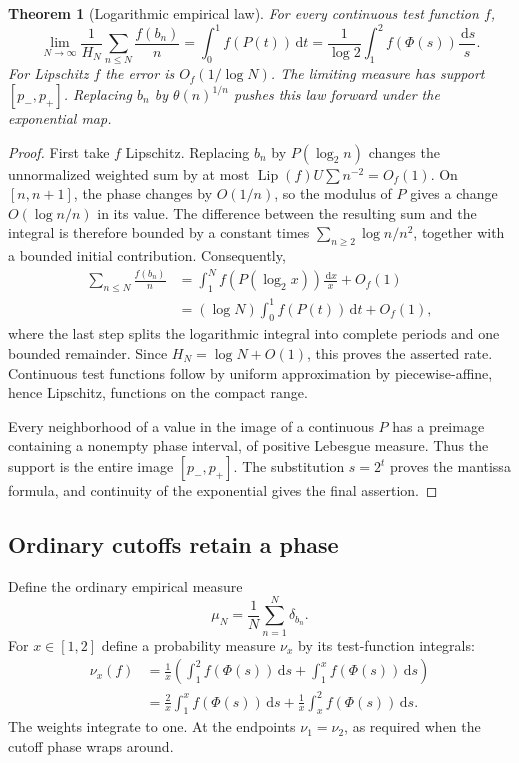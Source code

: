 \documentclass[11pt,a4paper]{article}
\numberwithin{equation}{section}
\newtheorem{theorem}{Theorem}[section]
\theoremstyle{definition}
\theoremstyle{remark}
\newcommand{\dd}{\,\mathrm d}
\theoremstyle{definition}
\theoremstyle{plain}
\begin{document}
\begin{theorem}[Logarithmic empirical law]
\label{dsr:thm:log-law}
For every continuous test function $f$,
\begin{equation}
 \lim_{N\to\infty}\frac1{H_N}\sum_{n\le N}\frac{f(b_n)}n
   =\int_0^1f(P(t))\dd t
   =\frac1{\log2}\int_1^2 f(\Phi(s))\frac{\dd s}{s}.
\label{dsr:eq:log-law}
\end{equation}
For Lipschitz $f$ the error is $O_f(1/\log N)$. The limiting measure has
support $[p_-,p_+]$. Replacing $b_n$ by $\theta(n)^{1/n}$ pushes this law
forward under the exponential map.
\end{theorem}
\begin{proof}
First take $f$ Lipschitz. Replacing $b_n$ by $P(\log_2n)$ changes the
unnormalized weighted sum by at most
$\operatorname{Lip}(f)U\sum n^{-2}=O_f(1)$.
On $[n,n+1]$, the phase changes by $O(1/n)$, so the modulus of $P$ gives a
change $O(\log n/n)$ in its value. The difference between the resulting sum
and the integral is therefore bounded by a constant times
$\sum_{n\ge2}\log n/n^2$, together with a bounded initial contribution.
Consequently,
\begin{align}
 \sum_{n\le N}\frac{f(b_n)}n
 &=\int_1^N f(P(\log_2x))\frac{\dd x}{x}+O_f(1)\\
 &=(\log N)\int_0^1f(P(t))\dd t+O_f(1),
\end{align}
where the last step splits the logarithmic integral into complete periods
and one bounded remainder. Since $H_N=\log N+O(1)$, this proves the asserted
rate. Continuous test functions follow by uniform approximation by
piecewise-affine, hence Lipschitz, functions on the compact range.

Every neighborhood of a value in the image of a continuous $P$ has a
preimage containing a nonempty phase interval, of positive Lebesgue measure.
Thus the support is the entire image $[p_-,p_+]$. The substitution
$s=2^t$ proves the mantissa formula, and continuity of the exponential gives
the final assertion.
\end{proof}

\subsection{Ordinary cutoffs retain a phase}
Define the ordinary empirical measure
\begin{equation}
 \mu_N=\frac1N\sum_{n=1}^N\delta_{b_n}.
\end{equation}
For $x\in[1,2]$ define a probability measure $\nu_x$ by its test-function
integrals:
\begin{align}
 \nu_x(f)
 &=\frac1x\left(\int_1^2f(\Phi(s))\dd s
                     +\int_1^x f(\Phi(s))\dd s\right)\label{dsr:eq:nu}\\
 &=\frac2x\int_1^x f(\Phi(s))\dd s
      +\frac1x\int_x^2f(\Phi(s))\dd s.\nonumber
\end{align}
The weights integrate to one. At the endpoints $\nu_1=\nu_2$, as required
when the cutoff phase wraps around.
\end{document}

